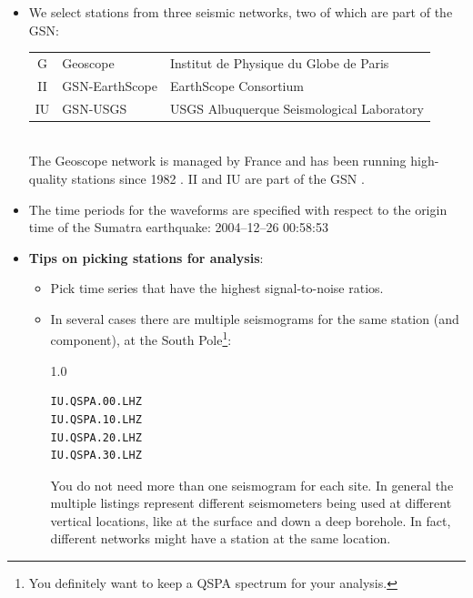 \documentclass[11pt,titlepage,fleqn]{article}
\begin{document}
\begin{itemize}
\item We select stations from three seismic networks, two of which are part of the GSN: \\

\begin{tabular}{cll}
\hline
G   & Geoscope        & Institut de Physique du Globe de Paris \\
II  & GSN-EarthScope  & EarthScope Consortium \\
IU  & GSN-USGS        & USGS Albuquerque Seismological Laboratory \\
\hline
\end{tabular} \\

\noindent
The Geoscope network is managed by France and has been running high-quality stations since 1982 \citep{Leroy2024}.
II and IU are part of the GSN \citep{Davis2024,Wilson2024}.

\item The time periods for the waveforms are specified with respect to the origin time of the Sumatra earthquake: 2004--12--26 00:58:53



\pagebreak

\item {\bf Tips on picking stations for analysis}:
\begin{itemize}
\item Pick time series that have the highest signal-to-noise ratios.
\item In several cases there are multiple seismograms for the same station (and component), \eg at the South Pole\footnote{You definitely want to keep a QSPA spectrum for your analysis.}:
%
\begin{spacing}{1.0}
\begin{verbatim}
IU.QSPA.00.LHZ
IU.QSPA.10.LHZ
IU.QSPA.20.LHZ
IU.QSPA.30.LHZ
\end{verbatim}
\end{spacing}
%
You do not need more than one seismogram for each site. In general the multiple listings represent different seismometers being used at different vertical locations, like at the surface and down a deep borehole. In fact, different networks might have a station at the same location.


\end{itemize}
\end{itemize}
\end{document}

